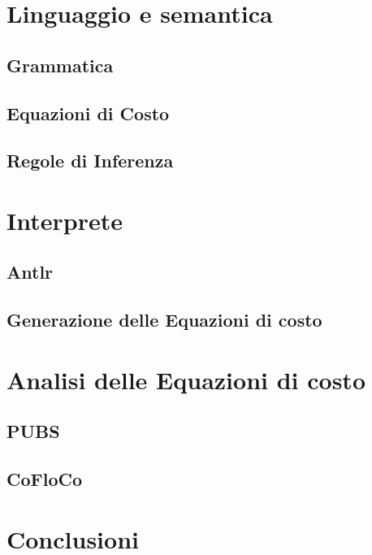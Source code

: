\documentclass[12pt,a4paper]{report}
\begin{document}
%

\tableofcontents




\chapter{Linguaggio e semantica}
\section{Grammatica}
\section{Equazioni di Costo}
\section{Regole di Inferenza}

\chapter{Interprete}
\section{Antlr}
\section{Generazione delle Equazioni di costo}

\chapter{Analisi delle Equazioni di costo}
\section{PUBS}
\section{CoFloCo}

\chapter{Conclusioni}


\printbibliography[title={Bibliografia}]
\end{document}
